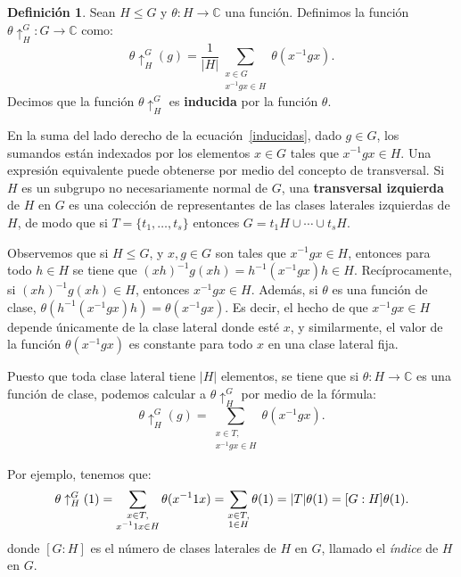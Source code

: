 \documentclass[12pt]{book}
\theoremstyle{definition}
\newtheorem{definition}[theorem]{Definición}
\newcounter{in}
\newcounter{ini}
\begin{document}
\begin{definition}
  Sean $H\leq G$ y $\theta:H\rightarrow \mathbb{C}$ una función. Definimos la
  función $\theta\uparrow^{G}_{H}:G\rightarrow \mathbb{C}$ como:
  \begin{equation}
    \label{inducidas}
    \theta\uparrow^{G}_{H}(g)=\frac{1}{|H|}\sum_{\substack{x\in
        G\\x^{-1}gx\in H}}\theta(x^{-1}gx).
  \end{equation}
  Decimos que la función $\theta\uparrow^{G}_{H}$ es \textbf{inducida}
  por la función $\theta$.
\end{definition}

En la suma del lado derecho de la ecuación~\ref{inducidas}, dado $g\in G$, los sumandos están
indexados por los elementos $x\in G$ tales que $x^{-1}gx\in H$.
Una expresión equivalente puede obtenerse por medio del concepto de transversal.
Si $H$ es un subgrupo no necesariamente normal de $G$, una \textbf{transversal izquierda} de $H$ en $G$ es una
colección de representantes de las clases laterales izquierdas de $H$,
de modo que si $T=\{t_{1},\ldots,t_{s}\}$ entonces
$G=t_{1}H\cup\cdots\cup t_{s}H$.

Observemos que si $H\leq G$, y $x,g\in G$ son tales que $x^{-1}gx\in
H$, entonces para todo $h\in H$ se tiene que
$(xh)^{-1}g(xh)=h^{-1}(x^{-1}gx)h\in H$. Recíprocamente, si
$(xh)^{-1}g(xh)\in H$, entonces $x^{-1}gx\in
H$. Además, si $\theta$ es una función de
clase, $\theta(h^{-1}(x^{-1}gx)h)=\theta(x^{-1}gx)$. Es decir, el
hecho de que $x^{-1}gx\in H$ depende únicamente de la clase lateral
donde esté $x$, y similarmente, el valor de la función
$\theta(x^{-1}gx)$ es constante para todo $x$ en una clase lateral fija.

Puesto que toda clase lateral tiene $|H|$ elementos, se tiene que si
$\theta:H\rightarrow\mathbb{C}$ es una función de clase, podemos
calcular a $\theta\uparrow^{G}_{H}$ por medio de la fórmula:
\begin{equation}
  \label{fun-ind-trans}
  \theta\uparrow^{G}_{H}(g)=\sum_{\substack{x\in T,\\x^{-1}gx\in H}}\theta(x^{-1}gx).
\end{equation}

Por ejemplo, tenemos que:
\begin{equation*}
  \theta\uparrow^{G}_{H}(1)=\sum_{\substack{x\in T,\\x^{-1}1x\in
      H}}\theta(x^{-1}1x)=\sum_{\substack{x\in T,\\1\in
      H}}\theta(1)=|T|\theta(1)=[G:H]\theta(1).\\
\end{equation*}
donde $[G:H]$ es el número de clases laterales de $H$ en $G$, llamado
el \emph{índice} de $H$ en $G$.
\end{document}
